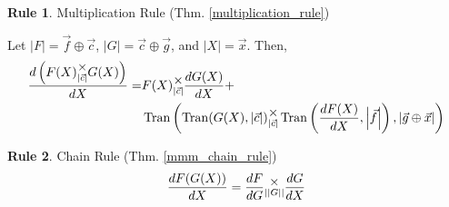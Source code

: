 \documentclass[12pt]{book}
\theoremstyle{plain}
\theoremstyle{definition}
\newtheorem{drule}{Rule}
\theoremstyle{ppart}
\theoremstyle{case}
\theoremstyle{solution}
\DeclareMathOperator{\Tran}{Tran}
\newcommand{\mmult}[1]{\text{\raisebox{1ex}{$\underset{#1}{\times}$}}}
\newcommand{\shape}[1]{\left|#1\right|}
\begin{document}
\begin{appendices}
\begin{drule}
Multiplication Rule
(Thm. \ref{multiplication_rule})

Let $\shape{F} = \vec{f} \oplus \vec{c}$, $\shape{G} = \vec{c} \oplus \vec{g}$,
and $\shape{X} = \vec{x}$. Then,
\begin{align*}
 \frac{d\left(F(X) \mmult{\shape{\vec{c}}} G(X)\right)}{dX} =&
 F(X) \mmult{\shape{\vec{c}}} \frac{dG(X)}{dX} + \\
 &\Tran\left(
   \Tran(G(X), \shape{\vec{c}})
     \mmult{\shape{\vec{c}}}
   \Tran\left(\frac{dF(X)}{dX}, \shape{\vec{f}}\right),
   \shape{\vec{g} \oplus \vec{x}}
 \right)
\end{align*}
\end{drule}

\begin{drule}
Chain Rule
(Thm. \ref{mmm_chain_rule})
\[ \frac{dF(G(X))}{dX} = \frac{dF}{dG} \mmult{\shape{\shape{G}}} \frac{dG}{dX} \]
\end{drule}

\end{appendices}



\end{document}
